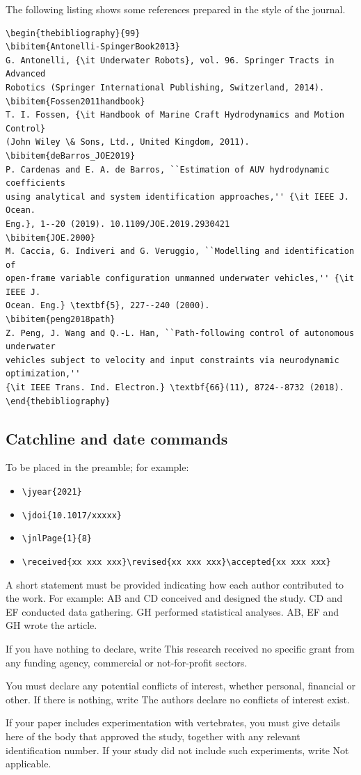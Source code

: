 \documentclass[DTMColor]{ROB-New}
\begin{document}
The following listing shows some references prepared in the style of the
journal.
%
{\fontsize{7}{9}\selectfont
\begin{verbatim}
\begin{thebibliography}{99}
\bibitem{Antonelli-SpingerBook2013}
G. Antonelli, {\it Underwater Robots}, vol. 96. Springer Tracts in Advanced
Robotics (Springer International Publishing, Switzerland, 2014).
\bibitem{Fossen2011handbook}
T. I. Fossen, {\it Handbook of Marine Craft Hydrodynamics and Motion Control}
(John Wiley \& Sons, Ltd., United Kingdom, 2011).
\bibitem{deBarros_JOE2019}
P. Cardenas and E. A. de Barros, ``Estimation of AUV hydrodynamic coefficients
using analytical and system identification approaches,'' {\it IEEE J. Ocean.
Eng.}, 1--20 (2019). 10.1109/JOE.2019.2930421
\bibitem{JOE.2000}
M. Caccia, G. Indiveri and G. Veruggio, ``Modelling and identification of
open-frame variable configuration unmanned underwater vehicles,'' {\it IEEE J.
Ocean. Eng.} \textbf{5}, 227--240 (2000).
\bibitem{peng2018path}
Z. Peng, J. Wang and Q.-L. Han, ``Path-following control of autonomous underwater
vehicles subject to velocity and input constraints via neurodynamic optimization,''
{\it IEEE Trans. Ind. Electron.} \textbf{66}(11), 8724--8732 (2018).
\end{thebibliography}
\end{verbatim}}
%
\subsection{Catchline and date commands}

To be placed in the preamble; for example:

\begin{itemize}
  \item \verb"\jyear{2021}"
  \item \verb"\jdoi{10.1017/xxxxx}"
  \item \verb"\jnlPage{1}{8}"
  \item \verb"\received{xx xxx xxx}\revised{xx xxx xxx}\accepted{xx xxx xxx}"
\end{itemize}

\begin{con}
A short statement must be provided indicating how each author contributed to the work. For example: AB and CD conceived and designed the study. CD and EF conducted data gathering. GH performed statistical analyses. AB, EF and GH wrote the article.

If you have nothing to declare, write This research received no specific grant from any funding agency, commercial or not-for-profit sectors.

You must declare any potential conflicts of interest, whether personal, financial or other. If there is nothing, write The authors declare no conflicts of interest exist.

If your paper includes experimentation with vertebrates, you must give details here of the body that approved the study, together with any relevant identification number. If your study did not include such experiments, write Not applicable.
\end{con}
\end{document}
